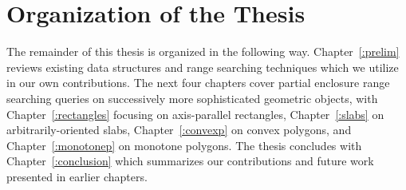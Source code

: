 \section{Organization of the Thesis}
\label{:intro:organization}

The remainder of this thesis is organized in the following way. 
Chapter~\ref{:prelim} reviews existing data structures and range searching techniques which we utilize in our own contributions.
The next four chapters cover partial enclosure range searching queries on successively more sophisticated geometric objects, with Chapter~\ref{:rectangles} focusing on axis-parallel rectangles, Chapter~\ref{:slabs} on arbitrarily-oriented slabs, Chapter~\ref{:convexp} on convex polygons, and Chapter~\ref{:monotonep} on monotone polygons.
The thesis concludes with Chapter~\ref{:conclusion} which summarizes our contributions and future work presented in earlier chapters.
